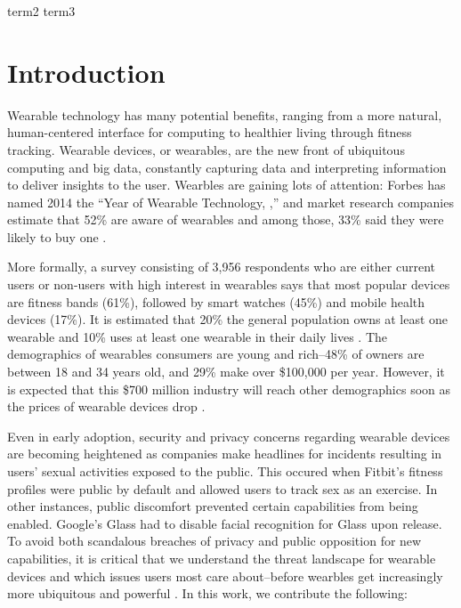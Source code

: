 \documentclass{acm_proc_article-sp}
\begin{document}
 {term2} {term3}



\section{Introduction}
Wearable technology has many potential benefits, ranging from a more natural, human-centered interface for computing to healthier living through fitness tracking. Wearable devices, or wearables, are the new front of ubiquitous computing and big data, constantly capturing data and interpreting information to deliver insights to the user. Wearbles are gaining lots of attention: Forbes has named 2014 the ``Year of Wearable Technology, \cite{Forbes},'' and market research companies estimate that 52\% are aware of wearables and among those, 33\% said they were likely to buy one \cite{NPD}. 

More formally, a survey consisting of 3,956 respondents who are either current users or non-users with high interest in wearables says that most popular devices are fitness bands (61\%), followed by smart watches (45\%) and mobile health devices (17\%)\cite{Nilsen}. It is estimated that 20\% the general population owns at least one wearable and 10\% uses at least one wearable in their daily lives \cite{WearableStatNews}. The demographics of wearables consumers are young and rich--48\% of owners are between 18 and 34 years old, and 29\% make over \$100,000 per year. However, it is expected that this \$700 million industry will reach other demographics soon as the prices of wearable devices drop \cite{cmo}. 



Even in early adoption, security and privacy concerns regarding wearable devices are becoming heightened as companies make headlines for incidents resulting in users' sexual activities exposed to the public. This occured when Fitbit's fitness profiles were public by default and allowed users to track sex as an exercise\cite{Fitbit}. In other instances, public discomfort prevented certain capabilities from being enabled. Google's Glass had to disable facial recognition for Glass \cite{GlassDetection} upon release. To avoid both scandalous breaches of privacy and public opposition for new capabilities, it is critical that we understand the threat landscape for wearable devices and which issues users most care about--before wearbles get increasingly more ubiquitous and powerful \cite{Implants}. In this work, we contribute the following: \\[-0.8cm]
\end{document}
